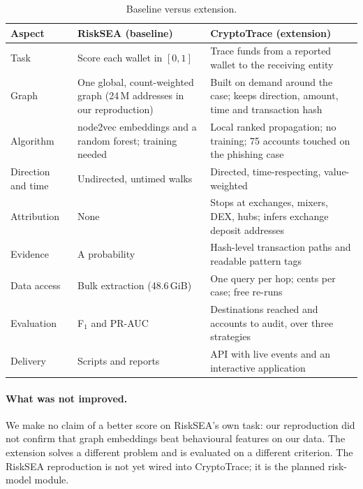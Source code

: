 \begin{table}[H]
\centering\small\singlespacing
\begin{tabular}{p{2.5cm} p{5.0cm} p{5.3cm}}
\toprule
\textbf{Aspect} & \textbf{RiskSEA (baseline)} & \textbf{CryptoTrace (extension)}\\
\midrule
Task & Score each wallet in $[0,1]$ & Trace funds from a reported wallet to the receiving entity\\
Graph & One global, count-weighted graph (24\,M addresses in our reproduction) & Built on demand around the case; keeps direction, amount, time and transaction hash\\
Algorithm & node2vec embeddings and a random forest; training needed & Local ranked propagation; no training; 75 accounts touched on the phishing case\\
Direction and time & Undirected, untimed walks & Directed, time-respecting, value-weighted\\
Attribution & None & Stops at exchanges, mixers, DEX, hubs; infers exchange deposit addresses\\
Evidence & A probability & Hash-level transaction paths and readable pattern tags\\
Data access & Bulk extraction (48.6\,GiB) & One query per hop; cents per case; free re-runs\\
Evaluation & F$_1$ and PR-AUC & Destinations reached and accounts to audit, over three strategies\\
Delivery & Scripts and reports & API with live events and an interactive application\\
\bottomrule
\end{tabular}
\caption{Baseline versus extension.}
\label{tab:improve}
\end{table}

\paragraph{What was not improved.} We make no claim of a better score on RiskSEA's own task: our reproduction did not confirm that graph embeddings beat behavioural features on our data. The extension solves a different problem and is evaluated on a different criterion. The RiskSEA reproduction is not yet wired into CryptoTrace; it is the planned risk-model module.

